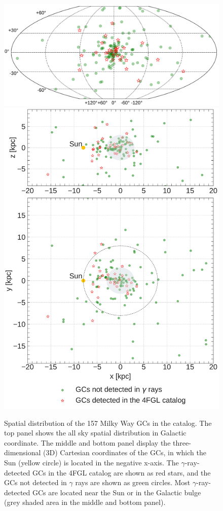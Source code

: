 \documentclass[doublespace,nopageskip]{VTthesis} %
\begin{document}
\begin{figure}
    \centering
    \includegraphics[width=\columnwidth]{Figures/Globular/AllSky_map.pdf} \\
    \includegraphics[width=\columnwidth]{Figures/Globular/distance_map.pdf}
    \caption{Spatial distribution of the 157 Milky Way GCs in the \citet{1996AJ....112.1487H} catalog. The top panel shows  the all sky spatial distribution in Galactic coordinate. The middle and bottom panel display the three-dimensional (3D) Cartesian %
    coordinates of the GCs, in which %
    the Sun (yellow circle) is located in the negative x-axis. The $\gamma$-ray-detected GCs in the 4FGL catalog are shown as red stars, %
    and the GCs not detected in $\gamma$ rays are shown as green circles. Most $\gamma$-ray-detected GCs are located near the Sun or in the Galactic bulge (grey shaded area in the middle and bottom panel).}
    \label{fig:all_sky_distribution}
\end{figure}
\end{document}
